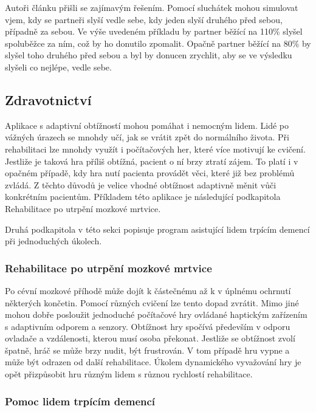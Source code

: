 Autoři článku přišli se zajímavým řešením. Pomocí sluchátek mohou simulovat vjem, kdy se partneři slyší vedle sebe, kdy jeden slyší druhého před sebou, případně za sebou. Ve výše uvedeném příkladu by partner běžící na 110\% slyšel spoluběžce za ním, což by ho donutilo zpomalit. Opačně partner běžící na 80\% by slyšel toho druhého před sebou a byl by donucen zrychlit, aby se ve výsledku slyšeli co nejlépe, vedle sebe.

\subsection{Zdravotnictví}

Aplikace s adaptivní obtížností mohou pomáhat i nemocným lidem. Lidé po vážných úrazech se mnohdy učí, jak se vrátit zpět do normálního života. Při rehabilitaci lze mnohdy využít i počítačových her, které více motivují ke cvičení. Jestliže je taková hra příliš obtížná, pacient o ní brzy ztratí zájem. To platí i v opačném případě, kdy hra nutí pacienta provádět věci, které již bez problémů zvládá. Z těchto důvodů je velice vhodné obtížnost adaptivně měnit vůči konkrétním pacientům. Příkladem této aplikace je následující podkapitola Rehabilitace po utrpění mozkové mrtvice.

Druhá podkapitola v této sekci popisuje program asistující lidem trpícím demencí při jednoduchých úkolech.

\subsubsection{Rehabilitace po utrpění mozkové mrtvice}

Po cévní mozkové příhodě může dojít k částečnému až k v úplnému ochrnutí některých končetin. Pomocí různých cvičení lze tento dopad zvrátit. Mimo jiné mohou dobře posloužit jednoduché počítačové hry ovládané haptickým zařízením s adaptivním odporem a senzory. Obtížnost hry spočívá především v odporu ovladače a vzdálenosti, kterou musí osoba překonat. Jestliže se obtížnost zvolí špatně, hráč se může brzy nudit, být frustrován. V tom případě hru vypne a může být odrazen od další rehabilitace. Úkolem dynamického vyvažování hry je opět přizpůsobit hru různým lidem s různou rychlostí rehabilitace. \cite{9Pomdp} 

\subsubsection{Pomoc lidem trpícím demencí}

